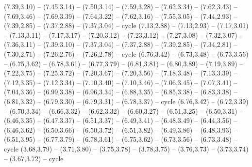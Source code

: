 \expandafter\def\csname geo:gebiet:SOM\endcsname{
  (7.39,3.10) -- (7.45,3.14) -- (7.50,3.14) -- (7.59,3.28) -- (7.62,3.34) -- (7.62,3.43) -- (7.69,3.46) -- (7.69,3.39) -- (7.64,3.22) -- (7.62,3.16) -- (7.55,3.05) -- (7.44,2.93) -- (7.39,2.85) -- (7.37,2.88) -- (7.37,3.04) -- cycle}
\expandafter\def\csname geo:gebiet:KEN\endcsname{
  (7.13,2.88) -- (7.13,2.93) -- (7.17,3.01) -- (7.13,3.11) -- (7.17,3.17) -- (7.20,3.12) -- (7.23,3.12) -- (7.27,3.08) -- (7.32,3.07) -- (7.36,3.11) -- (7.39,3.10) -- (7.37,3.04) -- (7.37,2.88) -- (7.39,2.85) -- (7.34,2.81) -- (7.30,2.71) -- (7.26,2.76) -- (7.26,2.78) -- cycle}
\expandafter\def\csname geo:gebiet:SDN\endcsname{
  (6.76,3.42) -- (6.73,3.48) -- (6.73,3.56) -- (6.75,3.62) -- (6.78,3.61) -- (6.77,3.79) -- (6.81,3.81) -- (6.80,3.89) -- (7.19,3.89) -- (7.22,3.75) -- (7.25,3.72) -- (7.20,3.67) -- (7.20,3.56) -- (7.18,3.48) -- (7.13,3.39) -- (7.12,3.35) -- (7.12,3.34) -- (7.10,3.40) -- (7.10,3.46) -- (7.06,3.45) -- (7.07,3.41) -- (7.04,3.36) -- (6.99,3.38) -- (6.96,3.34) -- (6.88,3.35) -- (6.85,3.38) -- (6.83,3.38) -- (6.81,3.32) -- (6.79,3.30) -- (6.79,3.31) -- (6.78,3.37) -- cycle}
\expandafter\def\csname geo:gebiet:TCD\endcsname{
  (6.76,3.42) -- (6.72,3.39) -- (6.70,3.34) -- (6.66,3.32) -- (6.62,3.32) -- (6.60,3.27) -- (6.51,3.25) -- (6.50,3.31) -- (6.46,3.35) -- (6.47,3.37) -- (6.51,3.37) -- (6.49,3.41) -- (6.48,3.49) -- (6.44,3.56) -- (6.46,3.62) -- (6.50,3.66) -- (6.50,3.72) -- (6.51,3.82) -- (6.49,3.86) -- (6.48,3.93) -- (6.51,3.95) -- (6.77,3.79) -- (6.78,3.61) -- (6.75,3.62) -- (6.73,3.56) -- (6.73,3.48) -- cycle}
\expandafter\def\csname geo:gebiet:HTI\endcsname{
  }
\expandafter\def\csname geo:gebiet:DOM\endcsname{
  (3.68,3.79) -- (3.71,3.80) -- (3.75,3.78) -- (3.78,3.75) -- (3.76,3.73) -- (3.73,3.74) -- (3.67,3.72) -- cycle}
